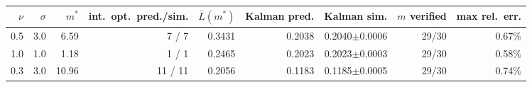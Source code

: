 \begin{tabular}{rrrrrrrrr}
\toprule
$\nu$ & $\sigma$ & $m^\ast$ & int.\ opt.\ pred./sim. & $\bar L(m^\ast)$ & Kalman pred. & Kalman sim. & $m$ verified & max rel.\ err. \\
\midrule
0.5 & 3.0 & 6.59 & 7 / 7 & 0.3431 & 0.2038 & 0.2040$\pm$0.0006 & 29/30 & 0.67\% \\
1.0 & 1.0 & 1.18 & 1 / 1 & 0.2465 & 0.2023 & 0.2023$\pm$0.0003 & 29/30 & 0.58\% \\
0.3 & 3.0 & 10.96 & 11 / 11 & 0.2056 & 0.1183 & 0.1185$\pm$0.0005 & 29/30 & 0.74\% \\
\bottomrule
\end{tabular}
